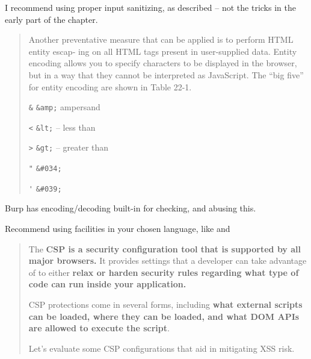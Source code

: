 \documentclass[Screen16to9,17pt]{foils}
\begin{document}
\begin{list2}
\item I recommend using proper input sanitizing, as described -- not the tricks in the early part of the chapter.
\end{list2}



\begin{quote}
Another preventative measure that can be applied is to perform HTML entity escap‐
ing on all HTML tags present in user-supplied data. Entity encoding allows you to
specify characters to be displayed in the browser, but in a way that they cannot be
interpreted as JavaScript.
The “big five” for entity encoding are shown in Table 22-1.

\begin{list2}
\item \verb+&+ \verb+&amp;+ ampersand
\item \verb+<+ \verb+&lt;+ -- less than
\item \verb+>+ \verb+&gt;+ -- greater than
\item \verb+"+ \verb+&#034;+
\item \verb+'+ \verb+&#039;+
\end{list2}
\end{quote}

Burp has encoding/decoding built-in for checking, and abusing this.

Recommend using facilities in your chosen language, like
 and




\begin{quote}
The {\bf CSP is a security configuration tool that is supported by all major browsers.} It provides settings that a developer can take advantage of to either {\bf relax or harden security rules regarding what type of code can run inside your application.}

CSP protections come in several forms, including {\bf what external scripts can be loaded, where they can be loaded, and what DOM APIs are allowed to execute the script}.

Let’s evaluate some CSP configurations that aid in mitigating XSS risk.
\end{quote}
\end{document}
